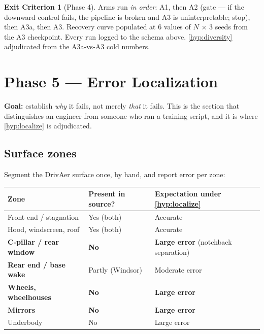 \documentclass[10pt,a4paper]{article}
\theoremstyle{definition}
\newtheorem{criterion}{Exit Criterion}[section]
\begin{document}
\begin{criterion}[Phase 4]
\label{crit:p4}
Arms run \emph{in order}: A1, then A2 (gate --- if the downward control fails, the
pipeline is broken and A3 is uninterpretable; stop), then A3a, then A3. Recovery curve
populated at 6 values of $N$ $\times$ 3 seeds from the A3 checkpoint. Every run logged
to the schema above. \cref{hyp:diversity} adjudicated from the A3a-vs-A3 cold numbers.
\end{criterion}

\section{Phase 5 --- Error Localization}

\textbf{Goal:} establish \emph{why} it fails, not merely \emph{that} it fails. This
is the section that distinguishes an engineer from someone who ran a training script,
and it is where \cref{hyp:localize} is adjudicated.

\subsection{Surface zones}

Segment the DrivAer surface once, by hand, and report error per zone:

\begin{center}\small
\begin{tabular}{@{}p{4.6cm}p{3.0cm}p{7.6cm}@{}}
\toprule
\textbf{Zone} & \textbf{Present in source?} & \textbf{Expectation under \cref{hyp:localize}} \\
\midrule
Front end / stagnation      & Yes (both) & Accurate \\
Hood, windscreen, roof      & Yes (both) & Accurate \\
\textbf{C-pillar / rear window} & \textbf{No} & \textbf{Large error} (notchback separation) \\
\textbf{Rear end / base wake}   & Partly (Windsor) & Moderate error \\
\textbf{Wheels, wheelhouses}    & \textbf{No} & \textbf{Large error} \\
\textbf{Mirrors}                & \textbf{No} & \textbf{Large error} \\
Underbody                   & No & Large error \\
\bottomrule
\end{tabular}
\end{center}
\end{document}
